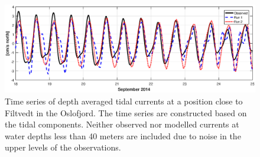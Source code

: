 \begin{figure}[!t]
\centering
\includegraphics[width=\textwidth]{fig_Filtvedt_timeseries}
\caption{Time series of depth averaged tidal currents at a position close to Filtvedt in the Oslofjord. The time series are constructed based on the tidal components. Neither observed nor modelled currents at water depths less than 40 meters are included due to noise in the upper levels of the observations.}
\label{fig:Filtvedt_timeseries}
\end{figure}



